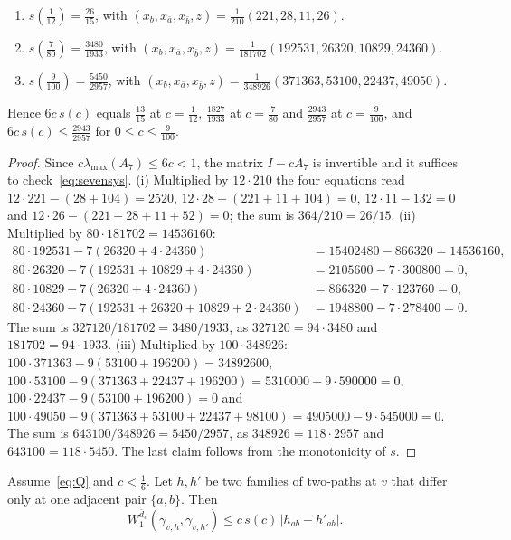 \begin{lemma}\label{lem:svalues}
\begin{enumerate}[label=\textup{(\roman*)},leftmargin=*]
\item $s(\frac1{12})=\frac{26}{15}$, with $(x_b,x_{\bar a},x_{\bar b},z)=
\frac1{210}(221,28,11,26)$.
\item $s(\frac7{80})=\frac{3480}{1933}$, with $(x_b,x_{\bar a},x_{\bar b},z)=
\frac1{181702}(192531,26320,10829,24360)$.
\item $s(\frac9{100})=\frac{5450}{2957}$, with $(x_b,x_{\bar a},x_{\bar b},z)=
\frac1{348926}(371363,53100,22437,49050)$.
\end{enumerate}
Hence $6c\,s(c)$ equals $\frac{13}{15}$ at $c=\frac1{12}$, $\frac{1827}{1933}$
at $c=\frac7{80}$ and $\frac{2943}{2957}$ at $c=\frac9{100}$, and
$6c\,s(c)\le\frac{2943}{2957}$ for $0\le c\le\frac9{100}$.
\end{lemma}

\begin{proof}
Since $c\lambda_{\max}(A_7)\le6c<1$, the matrix $I-cA_7$ is invertible and it
suffices to check~\eqref{eq:sevensys}. (i) Multiplied by $12\cdot210$ the four
equations read $12\cdot221-(28+104)=2520$, $12\cdot28-(221+11+104)=0$,
$12\cdot11-132=0$ and $12\cdot26-(221+28+11+52)=0$; the sum is
$364/210=26/15$. (ii) Multiplied by $80\cdot181702=14536160$:
\begin{align*}
80\cdot192531-7(26320+4\cdot24360)&=15402480-866320=14536160,\\
80\cdot26320-7(192531+10829+4\cdot24360)&=2105600-7\cdot300800=0,\\
80\cdot10829-7(26320+4\cdot24360)&=866320-7\cdot123760=0,\\
80\cdot24360-7(192531+26320+10829+2\cdot24360)&=1948800-7\cdot278400=0.
\end{align*}
The sum is $327120/181702=3480/1933$, as $327120=94\cdot3480$ and
$181702=94\cdot1933$. (iii) Multiplied by $100\cdot348926$:
$100\cdot371363-9(53100+196200)=34892600$,
$100\cdot53100-9(371363+22437+196200)=5310000-9\cdot590000=0$,
$100\cdot22437-9(53100+196200)=0$ and
$100\cdot49050-9(371363+53100+22437+98100)=4905000-9\cdot545000=0$. The sum
is $643100/348926=5450/2957$, as $348926=118\cdot2957$ and
$643100=118\cdot5450$. The last claim follows from the monotonicity of $s$.
\end{proof}

\begin{lemma}\label{lem:onestar}
Assume~\eqref{eq:Q} and $c<\frac16$. Let $h,h'$ be two families of two-paths
at $v$ that differ only at one adjacent pair $\{a,b\}$. Then
\[
W_1^{\bar d_v}(\gamma_{v,h},\gamma_{v,h'})\le c\,s(c)\,|h_{ab}-h'_{ab}| .
\]
\end{lemma}

